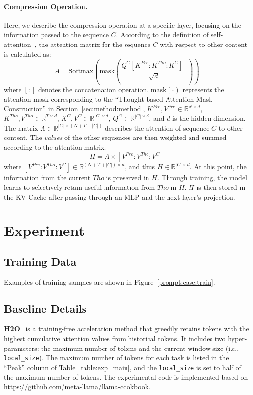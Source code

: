 \paragraph{Compression Operation.} 
Here, we describe the compression operation at a specific layer, focusing on the information passed to the sequence $C$. 
According to the definition of self-attention~\citep{nips17_transformer}, the attention matrix for the sequence $C$ with respect to other content is calculated as:
\[
A=\text{Softmax}(\text{mask}(\frac{Q^{C}[K^{Pre}:K^{Tho}:K^{C}]^{\top}}{\sqrt{d}}))
\]
where $[:]$ denotes the concatenation operation, $\text{mask}(\cdot)$ represents the attention mask corresponding to the ``Thought-based Attention Mask Construction'' in Section~\ref{sec:method:method}, 
$K^{Pre}, V^{Pre}\in \mathbb{R}^{N\times d}$, 
$K^{Tho}, V^{Tho}\in \mathbb{R}^{T\times d}$, 
$K^{C},V^{C}\in \mathbb{R}^{|C|\times d}$, $Q^{C}\in \mathbb{R}^{|C|\times d}$, 
and $d$ is the hidden dimension. The matrix $A\in \mathbb{R}^{|C|\times (N+T+|C|)}$ describes the attention of sequence $C$ to other content. 
The \textit{values} of the other sequences are then weighted and summed according to the attention matrix:
\[
H=A\times [V^{Pre}:V^{Tho}:{V^C}]
\]
where $[V^{Pre}:V^{Tho}:V^{C}]\in \mathbb{R}^{(N+T+|C|)\times d}$,
and thus $H\in \mathbb{R}^{|C|\times d}$. 
At this point, the information from the current $Tho$ is preserved in $H$. 
Through training, the model learns to selectively retain useful information from $Tho$ in $H$. 
$H$ is then stored in the KV Cache after passing through an MLP and the next layer's projection.


\section{Experiment}
\label{sec:app:exp}
\subsection{Training Data}
\label{sec:app:exp:train_data_case}
Examples of training samples are shown in Figure~\ref{prompt:case:train}.

\subsection{Baseline Details}
\label{sec:app:exp:baseline_details}
\textbf{H2O}~\citep{nips23_h2o} is a training-free acceleration method that greedily retains tokens with the highest cumulative attention values from historical tokens. 
It includes two hyper-parameters: the maximum number of tokens and the current window size (i.e., \texttt{local\_size}). 
The maximum number of tokens for each task is listed in the ``Peak'' column of Table~\ref{table:exp_main}, and the \texttt{local\_size} is set to half of the maximum number of tokens. 
The experimental code is implemented based on \url{https://github.com/meta-llama/llama-cookbook}.

